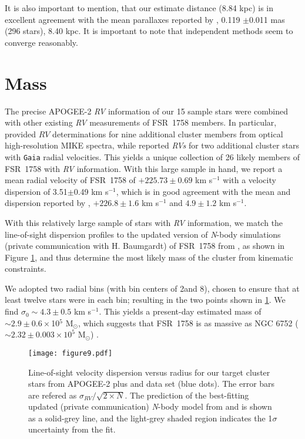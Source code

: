 \documentclass[longauth]{aa} %
\begin{document}
It is also important to mention, that our estimate distance (8.84 kpc) is in excellent agreement with the mean parallaxes reported by \citet{Vasiliev2021}, 0.119 $\pm$0.011 mas (296 stars), 8.40 kpc. It is important to note that independent methods seem to converge reasonably.

\section{Mass}
\label{section5}

The precise APOGEE-2 \textit{RV} information of our 15 sample stars were combined with other existing \textit{RV} measurements of  FSR~1758 members. In particular, \citet{Villanova2019} provided $RV$ determinations for nine additional cluster members from optical high-resolution MIKE spectra, while \citet{Simpson2019} reported \textit{RVs} for two additional cluster stars with \texttt{Gaia} radial velocities. This yields a unique collection of 26 likely members of FSR~1758 with \textit{RV} information. With this large sample in hand, we report a mean radial velocity of FSR~1758 of $+225.73\pm0.69$ km s$^{-1}$ with a velocity dispersion of  3.51$\pm$0.49 km s$^{-1}$, which is in good agreement with the mean and dispersion  reported by \citet{Villanova2019}, $+226.8\pm1.6$ km s$^{-1}$ and $4.9\pm1.2$ km s$^{-1}$.

With this relatively large sample of stars with \textit{RV} information, we match the line-of-sight dispersion profiles to the updated version of \textit{N}-body simulations (private communication with H. Baumgardt) of  FSR~1758 from \citet{Baumgardt2018, Baumgardt2019}, as shown in Figure \ref{Figure3}, and thus determine the most likely mass of the cluster from kinematic constraints. 

We adopted two radial bins (with bin centers of 2\arcmin and 8\arcmin), chosen to ensure that at least twelve stars were in each bin; resulting in the two points shown in \ref{Figure3}. We find $\sigma_{0}\sim4.3\pm0.5$ km s$^{-1}$. This yields a present-day estimated mass of $\sim2.9\pm0.6\times$10$^{5}$ M$_{\odot}$, which suggests that FSR~1758 is as massive as NGC 6752 ($\sim2.32\pm0.003 \times10^{5}$ M$_{\odot}$) \citep{Baumgardt2018, Baumgardt2019}.

\begin{figure}
	\begin{center}
		\texttt{[image: figure9.pdf]}
		\caption{Line-of-sight velocity dispersion versus radius for our target cluster stars from APOGEE-2 plus \citet{Villanova2019} and \citet{Simpson2019} data set (blue dots). The error bars are refered as $\sigma_{RV}/\sqrt{2\times N}$. The prediction of the best-fitting updated (private communication) \textit{N}-body model from \citep{Baumgardt2018} and \citet{Baumgardt2019} is shown as a solid-grey line, and the light-grey shaded region indicates the 1$\sigma$ uncertainty from the fit.} 
		\label{Figure3}
	\end{center}
\end{figure}
\end{document}
